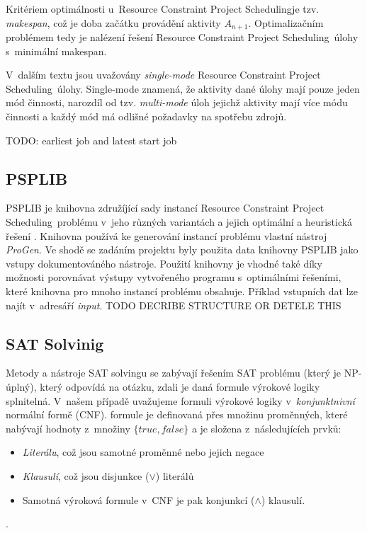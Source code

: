 \documentclass[a4paper, 12pt]{article}
\newcommand{\rcps}[0]{Resource Constraint Project Scheduling}
\begin{document}
Kritériem optimálnosti u~\rcps je tzv. \emph{makespan}, což je doba začátku provádění aktivity $A_{n+1}$.
Optimalizačním problémem tedy je nalézení řešení \rcps\ úlohy s~minimální makespan.

V~dalším textu jsou uvažovány \emph{single-mode} \rcps\ úlohy.
Single-mode znamená, že aktivity dané úlohy mají pouze jeden mód činnosti,
narozdíl od tzv. \emph{multi-mode} úloh jejichž aktivity mají více módu činnosti
a každý mód má odlišné požadavky na spotřebu zdrojů.

TODO: earliest job and latest start job

\subsection{PSPLIB}
PSPLIB je knihovna združíjící sady instancí \rcps\ problému v~jeho různých variantách a jejich optimální a heuristická řešení \cite{psplib}.
Knihovna používá ke generování instancí problému vlastní nástroj \emph{ProGen}.
Ve shodě se zadáním projektu byly použita data knihovny PSPLIB jako vstupy dokumentováného nástroje.
Použití knihovny je vhodné také díky možnosti porovnávat výstupy vytvořeného programu s~optimálními řešeními, které
knihovna pro mnoho instancí problému obsahuje.
Příklad vstupních dat lze najít v~adresáří \emph{input}.
TODO DECRIBE STRUCTURE OR DETELE THIS

\subsection{SAT Solvinig}
Metody a nástroje SAT solvingu se zabývají řešením SAT problému (který je NP-úplný),
který odpovídá na otázku, zdali je daná formule výrokové logiky splnitelná.
V~našem případě uvažujeme formuli výrokové logiky v~\emph{konjunktnivní} normální formě (CNF).
formule je definovaná přes množinu proměnných, které nabývají hodnoty z~množiny $\{true, false\}$
a je složena z~následujících prvků:
 \begin{itemize}
 	\item \emph{Literálu}, což jsou samotné proměnné nebo jejich negace
 	\item \emph{Klausulí}, což jsou disjunkce ($\vee$) literálů
	\item Samotná výroková formule v~CNF je pak konjunkcí ($\wedge$) klausulí.
 \end{itemize}.
\end{document}
